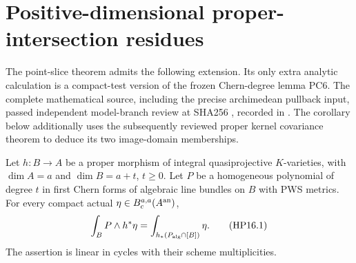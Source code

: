 \section{Positive-dimensional proper-intersection residues}
\label{r16hp:section}

The point-slice theorem admits the following extension. Its only extra
analytic calculation is a compact-test version of the frozen Chern-degree
lemma PC6. The complete mathematical source, including the precise
archimedean pullback input, passed independent model-branch review at
SHA256 ,
recorded in
.
The corollary below additionally uses the subsequently reviewed proper
kernel covariance theorem to deduce its two image-domain memberships.

\begin{lemma}
\label{r16hp:degree}
Let $h:B\to A$ be a proper morphism of integral quasiprojective
$K$-varieties, with $\dim A=a$ and $\dim B=a+t$, $t\geq0$. Let $P$
be a homogeneous polynomial of degree $t$ in first Chern forms of
algebraic line bundles on $B$ with PWS metrics. For every compact actual
$\eta\in B_c^{a,a}(A^{\rm an})$,
\[
 \int_B P\wedge h^*\eta
      =\int_{h_*(P_{\rm alg}\cap[B])}\eta.
 \tag{HP16.1}\label{r16hp:degree-eq}
\]
The assertion is linear in cycles with their scheme multiplicities.
\end{lemma}

